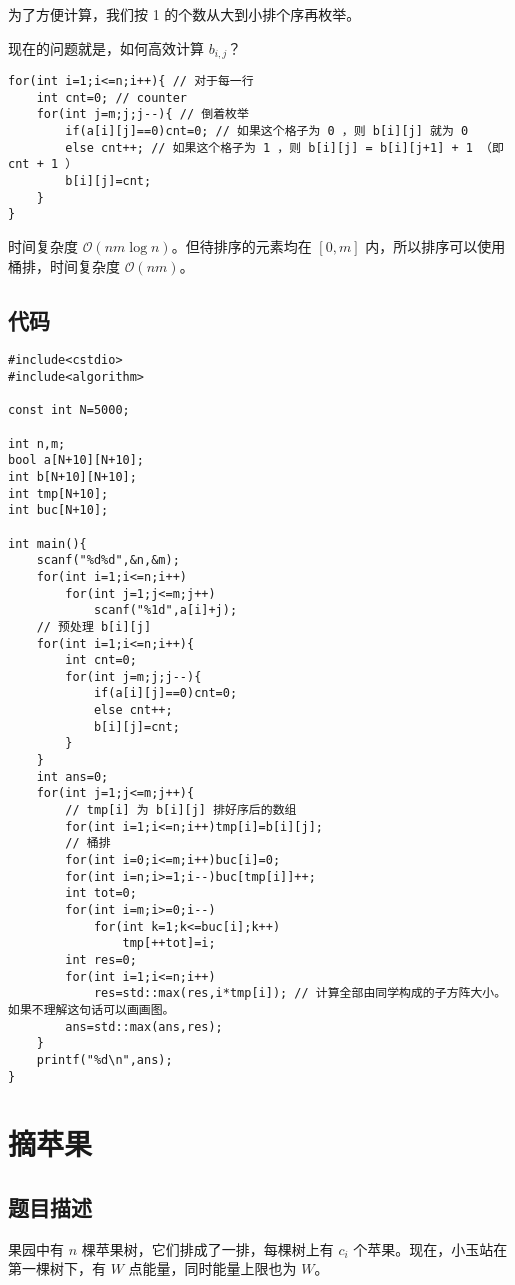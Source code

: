\documentclass{article}
\begin{document}
	为了方便计算，我们按 1 的个数从大到小排个序再枚举。

	现在的问题就是，如何高效计算 $b_{i,j}$？

	\begin{lstlisting}
for(int i=1;i<=n;i++){ // 对于每一行
	int cnt=0; // counter
	for(int j=m;j;j--){ // 倒着枚举
		if(a[i][j]==0)cnt=0; // 如果这个格子为 0 ，则 b[i][j] 就为 0
		else cnt++; // 如果这个格子为 1 ，则 b[i][j] = b[i][j+1] + 1 （即 cnt + 1 ）
		b[i][j]=cnt;
	}
}
	\end{lstlisting}

	时间复杂度 $\mathcal O(nm\log n)$。但待排序的元素均在 $[0,m]$ 内，所以排序可以使用桶排，时间复杂度 $\mathcal O(nm)$。

	\subsection{代码}

	\begin{lstlisting}
#include<cstdio>
#include<algorithm>

const int N=5000;

int n,m;
bool a[N+10][N+10];
int b[N+10][N+10];
int tmp[N+10];
int buc[N+10];

int main(){
	scanf("%d%d",&n,&m);
	for(int i=1;i<=n;i++)
		for(int j=1;j<=m;j++)
			scanf("%1d",a[i]+j);
	// 预处理 b[i][j]
	for(int i=1;i<=n;i++){
		int cnt=0;
		for(int j=m;j;j--){
			if(a[i][j]==0)cnt=0;
			else cnt++;
			b[i][j]=cnt;
		}
	}
	int ans=0;
	for(int j=1;j<=m;j++){
		// tmp[i] 为 b[i][j] 排好序后的数组
		for(int i=1;i<=n;i++)tmp[i]=b[i][j];
		// 桶排
		for(int i=0;i<=m;i++)buc[i]=0;
		for(int i=n;i>=1;i--)buc[tmp[i]]++;
		int tot=0;
		for(int i=m;i>=0;i--)
			for(int k=1;k<=buc[i];k++)
				tmp[++tot]=i;
		int res=0;
		for(int i=1;i<=n;i++)
			res=std::max(res,i*tmp[i]); // 计算全部由同学构成的子方阵大小。如果不理解这句话可以画画图。
		ans=std::max(ans,res);
	}
	printf("%d\n",ans);
}
	\end{lstlisting}

	\newpage

	\section{摘苹果}

	\subsection{题目描述}

	果园中有 $n$ 棵苹果树，它们排成了一排，每棵树上有 $c_{i}$ 个苹果。现在，小玉站在第一棵树下，有 $W$ 点能量，同时能量上限也为 $W$。
\end{document}
